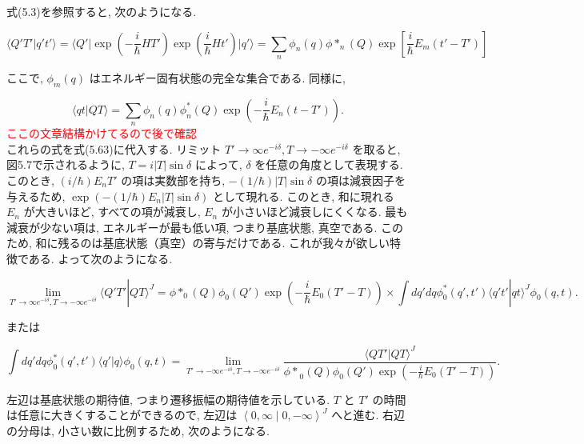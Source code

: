 \documentclass{jsarticle}
\newcommand{\braket}[2]{\left\langle #1\middle|#2\right\rangle}
\begin{document}
式(5.3)を参照すると, 次のようになる.

\begin{equation*}
\langle Q'T' | q't' \rangle = \langle Q' | \exp \left( -\frac{i}{\hbar} H T' \right) \exp \left( \frac{i}{\hbar} H t' \right) | q' \rangle = \sum_{n} \phi_n (q) \phi*_n (Q) \exp\left[ \frac{i}{\hbar}E_m (t' - T') \right] \tag{5.64}
\end{equation*}

ここで, \( \phi_m(q) \) はエネルギー固有状態の完全な集合である. 同様に,

\begin{equation*}
\langle qt | QT \rangle = \sum_n \phi_n(q)\phi_n^*(Q) \exp \left( -\frac{i}{\hbar} E_n(t-T') \right). \tag{5.65}
\end{equation*}
\textcolor{red}{ここの文章結構かけてるので後で確認\\}
これらの式を式(5.63)に代入する. リミット \( T' \to \infty e^{-i\delta}, T \to -\infty e^{-i\delta} \) を取ると, 図5.7で示されるように, \( T = i|T|\sin\delta \) によって, \( \delta \) を任意の角度として表現する. このとき, \( (i/\hbar) E_n T' \) の項は実数部を持ち, \( - (1/\hbar)|T|\sin\delta \) の項は減衰因子を与えるため, \( \exp(-(1/\hbar) E_n |T|\sin\delta) \) として現れる. このとき, 和に現れる \( E_n \) が大きいほど, すべての項が減衰し, \( E_n \) が小さいほど減衰しにくくなる. 最も減衰が少ない項は, エネルギーが最も低い項, つまり基底状態, 真空である. このため, 和に残るのは基底状態（真空）の寄与だけである. これが我々が欲しい特徴である. よって次のようになる.

\begin{equation*}
\lim_{T' \to \infty e^{-i\delta}, T \to -\infty e^{-i\delta}} \langle Q'T' | QT \rangle^J = \phi*_0(Q)\phi_0(Q') \exp \left( -\frac{i}{\hbar} E_0(T'-T) \right)\times \int dq' dq \phi_0^*(q', t') \langle q't' | qt \rangle^J \phi_0(q, t).
\end{equation*}

または

\begin{equation*}
\int dq' dq \phi_0^*(q', t') \langle q' | q \rangle \phi_0(q, t) = \lim_{T' \to -\infty e^{-i\delta}, T \to -\infty e^{-i\delta}} \frac{ \langle QT' | QT \rangle^J}{{\phi*}_{0}(Q)\phi_0(Q')\exp \left( -\frac{i}{\hbar} E_0(T'-T) \right)} . \tag{5.66}
\end{equation*}

左辺は基底状態の期待値, つまり遷移振幅の期待値を示している. \( T \) と \( T' \) の時間は任意に大きくすることができるので, 左辺は $\braket{0, \infty}{0, -\infty}^J$ へと進む. 右辺の分母は, 小さい数に比例するため, 次のようになる.
\end{document}
